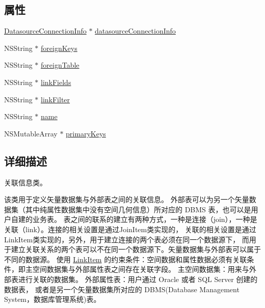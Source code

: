 \subsection*{属性}
\begin{DoxyCompactItemize}
\item 
\hyperlink{interface_datasource_connection_info}{Datasource\-Connection\-Info} $\ast$ \hyperlink{interface_link_item_ac227b65db18a97406f2989367279d5b1}{datasource\-Connection\-Info}
\item 
N\-S\-String $\ast$ \hyperlink{interface_link_item_a033a104355e0dd425688c1ace667ee15}{foreign\-Keys}
\item 
N\-S\-String $\ast$ \hyperlink{interface_link_item_a030e9399a97d2a165aa2ce69b798b115}{foreign\-Table}
\item 
N\-S\-String $\ast$ \hyperlink{interface_link_item_a480a48b69d6e2c01fa2bc35f584381f3}{link\-Fields}
\item 
N\-S\-String $\ast$ \hyperlink{interface_link_item_ac1a913e4de4457d2e7fdcc34e7e4d254}{link\-Filter}
\item 
N\-S\-String $\ast$ \hyperlink{interface_link_item_a85d67fda78ae47f1415897d8330f62df}{name}
\item 
N\-S\-Mutable\-Array $\ast$ \hyperlink{interface_link_item_a31d7f4023218fdfef008cec5ae17ea15}{primary\-Keys}
\end{DoxyCompactItemize}


\subsection{详细描述}
关联信息类。 \par
 该类用于定义矢量数据集与外部表之间的关联信息。 外部表可以为另一个矢量数据集（其中纯属性数据集中没有空间几何信息）所对应的 D\-B\-M\-S 表，也可以是用户自建的业务表。 表之间的联系的建立有两种方式，一种是连接（join），一种是关联（link）。连接的相关设置是通过\-Join\-Item类实现的， 关联的相关设置是通过\-Link\-Item类实现的，另外，用于建立连接的两个表必须在同一个数据源下， 而用于建立关联关系的两个表可以不在同一个数据源下。矢量数据集与外部表可以属于不同的数据源。 使用 \hyperlink{interface_link_item}{Link\-Item} 的约束条件：空间数据和属性数据必须有关联条件，即主空间数据集与外部属性表之间存在关联字段。 主空间数据集：用来与外部表进行关联的数据集。 外部属性表：用户通过 Oracle 或者 S\-Q\-L Server 创建的数据表， 或者是另一个矢量数据集所对应的 D\-B\-M\-S(Database Management System，数据库管理系统)表。 


